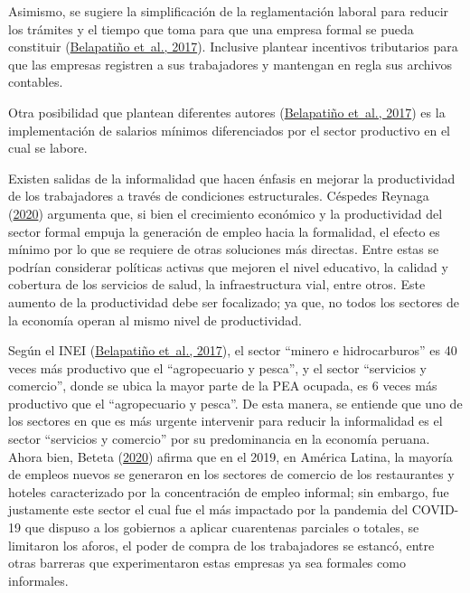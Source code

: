 \documentclass[
  letterpaper,
  12pt,
  oneside,
  spanish,
  doublespacing,
  headsepline,
  parskip]{MastersDoctoralThesis}
\begin{document}
Asimismo, se sugiere la simplificación de la reglamentación laboral para
reducir los trámites y el tiempo que toma para que una empresa formal se
pueda constituir (\protect\hyperlink{ref-belapatiuxf1o2017}{Belapatiño
et~al., 2017}). Inclusive plantear incentivos tributarios para que las
empresas registren a sus trabajadores y mantengan en regla sus archivos
contables.

Otra posibilidad que plantean diferentes autores
(\protect\hyperlink{ref-belapatiuxf1o2017}{Belapatiño et~al., 2017}) es
la implementación de salarios mínimos diferenciados por el sector
productivo en el cual se labore.

Existen salidas de la informalidad que hacen énfasis en mejorar la
productividad de los trabajadores a través de condiciones estructurales.
Céspedes Reynaga (\protect\hyperlink{ref-cuxe9spedesreynaga2020}{2020})
argumenta que, si bien el crecimiento económico y la productividad del
sector formal empuja la generación de empleo hacia la formalidad, el
efecto es mínimo por lo que se requiere de otras soluciones más
directas. Entre estas se podrían considerar políticas activas que
mejoren el nivel educativo, la calidad y cobertura de los servicios de
salud, la infraestructura vial, entre otros. Este aumento de la
productividad debe ser focalizado; ya que, no todos los sectores de la
economía operan al mismo nivel de productividad.

Según el INEI (\protect\hyperlink{ref-belapatiuxf1o2017}{Belapatiño
et~al., 2017}), el sector ``minero e hidrocarburos'' es 40 veces más
productivo que el ``agropecuario y pesca'', y el sector ``servicios y
comercio'', donde se ubica la mayor parte de la PEA ocupada, es 6 veces
más productivo que el ``agropecuario y pesca''. De esta manera, se
entiende que uno de los sectores en que es más urgente intervenir para
reducir la informalidad es el sector ``servicios y comercio'' por su
predominancia en la economía peruana. Ahora bien, Beteta
(\protect\hyperlink{ref-beteta2020}{2020}) afirma que en el 2019, en
América Latina, la mayoría de empleos nuevos se generaron en los
sectores de comercio de los restaurantes y hoteles caracterizado por la
concentración de empleo informal; sin embargo, fue justamente este
sector el cual fue el más impactado por la pandemia del COVID-19 que
dispuso a los gobiernos a aplicar cuarentenas parciales o totales, se
limitaron los aforos, el poder de compra de los trabajadores se estancó,
entre otras barreras que experimentaron estas empresas ya sea formales
como informales.
\end{document}
